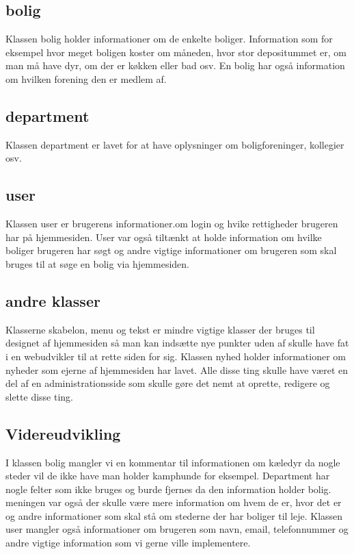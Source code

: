 \documentclass[12pt, a4paper]{report}
\begin{document}
\subsection{bolig}
Klassen bolig holder informationer om de enkelte boliger. Information som for eksempel hvor meget boligen koster om måneden, hvor stor depositummet er, om man må have dyr, om der er køkken eller bad osv. En bolig har også information om hvilken forening den er medlem af.

\subsection{department}
Klassen department er lavet for at have oplysninger om boligforeninger, kollegier osv.

\subsection{user}
Klassen user er brugerens informationer.om login og hvike rettigheder brugeren har på hjemmesiden. User var også tiltænkt at holde information om hvilke boliger brugeren har søgt og andre vigtige informationer om brugeren som skal bruges til at søge en bolig via hjemmesiden.

\subsection{andre klasser}
Klasserne skabelon, menu og tekst er mindre vigtige klasser der bruges til designet af hjemmesiden så man kan indsætte nye punkter uden af skulle have fat i en webudvikler til at rette siden for sig.
Klassen nyhed holder informationer om nyheder som ejerne af hjemmesiden har lavet.
Alle disse ting skulle have været en del af en administrationsside som skulle gøre det nemt at oprette, redigere og slette disse ting.

\subsection{Videreudvikling}
I klassen bolig mangler vi en kommentar til informationen om kæledyr da nogle steder vil de ikke have man holder kamphunde for eksempel.
Department har nogle felter som ikke bruges og burde fjernes da den information holder bolig. meningen var også der skulle være mere information om hvem de er, hvor det er og andre informationer som skal stå om stederne der har boliger til leje.
Klassen user mangler også informationer om brugeren som navn, email, telefonnummer og andre vigtige information som vi gerne ville implementere.
\end{document}
